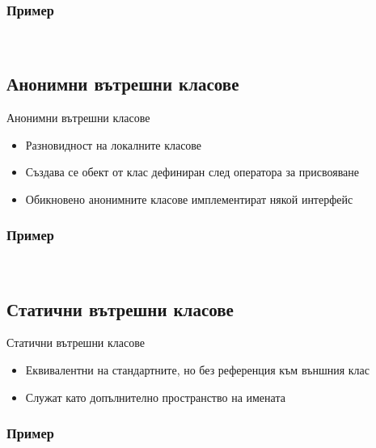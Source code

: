 \documentclass{beamer}
\begin{document}
\begin{frame}[fragile]
  \frametitle{Пример}
  \transdissolve
\begin{lstlisting}
  
\end{lstlisting}
\end{frame}

\subsection{Анонимни вътрешни класове}
\begin{frame}{Анонимни вътрешни класове}
  \transdissolve
  \begin{itemize}
  \item Разновидност на локалните класове
  \item Създава се обект от клас дефиниран след оператора за
    присвояване
  \item Обикновено анонимните класове имплементират някой интерфейс
  \end{itemize}
\end{frame}

\begin{frame}[fragile]
  \frametitle{Пример}
  \transdissolve
\begin{lstlisting}
  
\end{lstlisting}
\end{frame}

\subsection{Статични вътрешни класове}
\begin{frame}{Статични вътрешни класове}
  \transdissolve
  \begin{itemize}
  \item Еквивалентни на стандартните, но без референция към външния
    клас
  \item Служат като допълнително пространство на имената
  \end{itemize}
\end{frame}

\begin{frame}[fragile]
  \frametitle{Пример}
  \transdissolve
\begin{lstlisting}
  
\end{lstlisting}
\end{frame}
\end{document}
